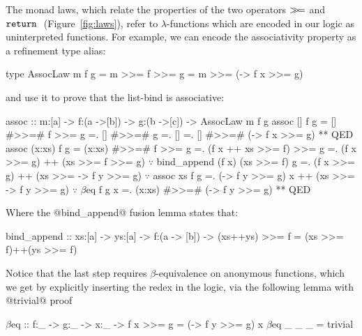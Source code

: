 
%
The monad laws, which relate the
properties of the two operators
$\gg\!=$ and $\texttt{return}\ $ (Figure~\ref{fig:laws}),
refer to $\lambda$-functions which
are encoded in our logic as uninterpreted functions.
%
For example, we can encode the associativity property
as a refinement type alias:
%
\begin{code}
  type AssocLaw m f g = { m >>= f >>= g = m >>= (\x -> f x >>= g) }
\end{code}
%
and use it to prove that the list-bind is associative:
%
\begin{mcode}
  assoc :: m:[a] -> f:(a ->[b]) -> g:(b ->[c]) -> AssocLaw m f g
  assoc [] f g     =  [] #>>=# f >>= g
                   =. [] #>>=# g
                   =. []
                   =. [] #>>=# (\x -> f x >>= g) ** QED
  assoc (x:xs) f g =  (x:xs) #>>=# f  >>= g
                   =. (f x ++ xs >>= f) >>= g
                   =. (f x >>= g) ++ (xs >>= f >>= g) $\because$ bind_append (f x) (xs >>= f) g
                   =. (f x >>= g) ++ (xs >>= \y -> f y >>= g) $\because$ assoc xs f g
                   =. (\y -> f y >>= g) x ++ (xs >>= \y -> f y >>= g) $\because$ $\beta$eq f g x
                   =. (x:xs) #>>=# (\y -> f y >>= g) ** QED
\end{mcode}
%
Where the @bind_append@ fusion lemma states that:
%
\begin{code}
bind_append
  :: xs:[a] -> ys:[a] -> f:(a -> [b]) -> {(xs++ys) >>= f = (xs >>= f)++(ys >>= f)}
\end{code}
%
Notice that the last step requires
$\beta$-equivalence on anonymous
functions, which we get by explicitly
inserting the redex in the logic,
via the following lemma with @trivial@ proof
%
\begin{mcode}
    $\beta$eq :: f:_ -> g:_ -> x:_ -> {f x >>= g = (\y -> f y >>= g) x}
    $\beta$eq _ _ _ = trivial
\end{mcode}

